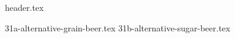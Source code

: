 \clearpage
{}
\divisorLine
{header.tex}
\begin{multicols}{2}
{31a-alternative-grain-beer.tex}
{31b-alternative-sugar-beer.tex}
\end{multicols}